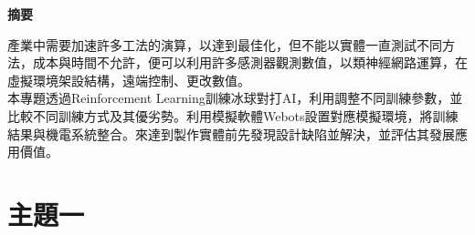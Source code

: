 \documentclass[14pt,a4paper]{article}
\begin{document}
\begin{center}

\LARGE\textbf{摘要}\\
\begin{Large}
\begin{flushleft}
\hspace{12pt} 產業中需要加速許多工法的演算，以達到最佳化，但不能以實體一直測試不同方法，成本與時間不允許，便可以利用許多感測器觀測數值，以類神經網路運算，在虛擬環境架設結構，遠端控制、更改數值。\\
 \hspace{12pt} 本專題透過Reinforcement Learning訓練冰球對打AI，利用調整不同訓練參數，並比較不同訓練方式及其優劣勢。利用模擬軟體Webots設置對應模擬環境，將訓練結果與機電系統整合。來達到製作實體前先發現設計缺陷並解決，並評估其發展應用價值。
\end{flushleft}
\end{Large}
\newpage
\renewcommand{\contentsname}{\centerline{\fontsize{18pt}{\baselineskip}\selectfont\textbf{目\quad 錄}}}
\tableofcontents
\newpage
\renewcommand{\listfigurename}{\centerline{\fontsize{18pt}{\baselineskip}\selectfont\textbf{圖\quad 表\quad 目\quad 錄 }}}
\listoffigures
\newpage
\end{center}
\newpage
\section{主題一}
\setcounter{page}{1}
\end{document}
